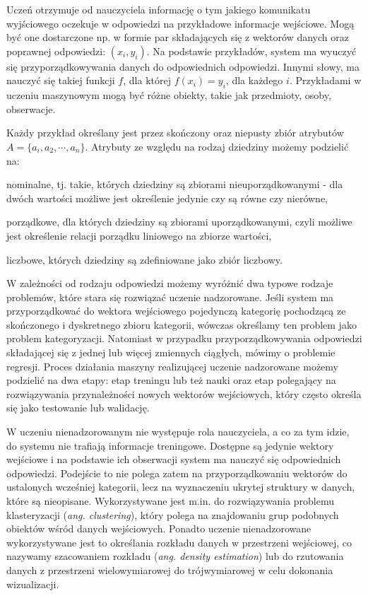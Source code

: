 Uczeń otrzymuje od nauczyciela informację o tym jakiego komunikatu wyjściowego oczekuje w odpowiedzi na przykładowe informacje wejściowe. Mogą być one dostarczone np. w formie par składających się z wektorów danych oraz poprawnej odpowiedzi: $(x_{i}, y_{i})$. Na podstawie przykładów, system ma wyuczyć się przyporządkowywania danych do odpowiednich odpowiedzi. Innymi słowy, ma nauczyć się takiej funkcji $f$, dla której $f(x_{i})=y_{i}$, dla każdego $i$. Przykładami w uczeniu maszynowym mogą być różne obiekty, takie jak przedmioty, osoby, obserwacje.

Każdy przykład określany jest przez skończony oraz niepusty zbiór atrybutów $A=\lbrace a_{i}, a_{2}, \cdots, a_{n}\rbrace$. Atrybuty ze względu na rodzaj dziedziny możemy podzielić na: 
\begin{compactitem}
	\item nominalne, tj. takie, których dziedziny są zbiorami nieuporządkowanymi - dla dwóch wartości możliwe jest określenie jedynie czy są równe czy nierówne,
	\item porządkowe, dla których dziedziny są zbiorami uporządkowanymi, czyli możliwe jest określenie relacji porządku liniowego na zbiorze wartości,
	\item liczbowe, których dziedziny są zdefiniowane jako zbiór liczbowy.
\end{compactitem}

W zależności od rodzaju odpowiedzi możemy wyróżnić dwa typowe rodzaje problemów, które stara się rozwiązać uczenie nadzorowane. Jeśli system ma przyporządkować do wektora wejściowego pojedynczą kategorię pochodzącą ze skończonego i dyskretnego zbioru kategorii, wówczas określamy ten problem jako problem kategoryzacji. Natomiast w przypadku przyporządkowywania odpowiedzi składającej się z jednej lub więcej zmiennych ciągłych, mówimy o problemie regresji.\cite{BISHOP06} Proces działania maszyny realizującej uczenie nadzorowane możemy podzielić na dwa etapy: etap treningu lub też nauki oraz etap polegający na rozwiązywania przynależności nowych wektorów wejściowych, który często określa się jako testowanie lub walidację.

W uczeniu nienadzorowanym nie występuje rola nauczyciela, a co za tym idzie, do systemu nie trafiają informacje treningowe. Dostępne są jedynie wektory wejściowe i na podstawie ich obserwacji system ma nauczyć się odpowiednich odpowiedzi.\cite{CICHOSZ00} Podejście to nie polega zatem na przyporządkowaniu wektorów do ustalonych wcześniej kategorii, lecz na wyznaczeniu ukrytej struktury w danych, które są nieopisane.\cite{VALPOLA} Wykorzystywane jest m.in. do rozwiązywania problemu klasteryzacji (\emph{ang. clustering}), który polega na znajdowaniu grup podobnych obiektów wśród danych wejściowych. Ponadto uczenie nienadzorowane wykorzystywane jest to określania rozkładu danych w przestrzeni wejściowej, co nazywamy szacowaniem rozkładu (\emph{ang. density estimation}) lub do rzutowania danych z przestrzeni wielowymiarowej do trójwymiarowej w celu dokonania wizualizacji.\cite{BISHOP06}

